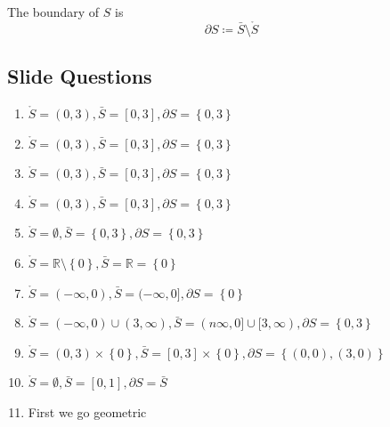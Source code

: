 \documentclass[11pt]{book}
\begin{document}
\newpage

\begin{defn}[Boundary]\label{defn:boundary}
    The boundary of $S$ is 
    \[
    \partial S \coloneqq \bar{S} \setminus \mathring{S} 
    \]
\end{defn}

\subsection{Slide Questions}%
\label{sub:slide_questions}

\begin{enumerate}
    \item $\mathring{S} = \left( 0,3 \right) , \bar{S} = \left[ 0,3 \right] , \partial S = \left\{ 0,3 \right\} $ 
    \item $\mathring{S} = \left( 0,3 \right) , \bar{S} = \left[ 0,3 \right] , \partial S = \left\{ 0,3 \right\} $ 
    \item $\mathring{S} = \left( 0,3 \right) , \bar{S} = \left[ 0,3 \right] , \partial S = \left\{ 0,3 \right\} $ 
    \item $\mathring{S} = \left( 0,3 \right) , \bar{S} = \left[ 0,3 \right] , \partial S = \left\{ 0,3 \right\} $ 
    \item $\mathring{S} = \emptyset , \bar{S} = \left\{ 0, 3 \right\} , \partial S= \left\{ 0, 3 \right\}  $ 
    \item $\mathring{S} = \mathbb{R} \setminus \left\{ 0 \right\} , \bar{S} = \mathbb{R} = \left\{ 0 \right\} $
    \item $\mathring{S} = \left(  - \infty , 0 \right), \bar{S} = (  - \infty , 0] , \partial S = \left\{ 0 \right\} $ 
    \item $\mathring{S} = \left(  - \infty ,0 \right) \cup \left( 3, \infty  \right), \bar{S} = (n\infty , 0] \cup [3, \infty ) , \partial S = \left\{ 0, 3 \right\} $ 
    \item $\mathring{S} = \left( 0, 3 \right) \times \left\{ 0 \right\}, \bar{S} = \left[ 0, 3 \right] \times \left\{ 0 \right\} , \partial S = \left\{ \left( 0, 0 \right) , \left( 3, 0 \right)  \right\}   $ 
    \item $\mathring{S} = \emptyset , \bar{S} = \left[ 0,1 \right] , \partial S= \bar{S} $ 
    \item First we go geometric
        \begin{center}

\end{center}
\end{enumerate}
\end{document}
